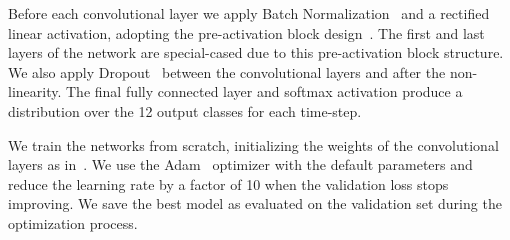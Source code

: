 Before each convolutional layer we apply Batch
Normalization~\cite{ioffe2015batch} and a rectified linear activation, adopting
the pre-activation block design~\cite{he2016deep}. The first and last layers of
the network are special-cased due to this pre-activation block structure. We
also apply Dropout~\cite{srivastava2014dropout} between the convolutional
layers and after the non-linearity. The final fully connected layer and softmax
activation produce a distribution over the 12 output classes for each
time-step.

We train the networks from scratch, initializing the weights of the
convolutional layers as in~\cite{he2015delving}. We use the
Adam~\cite{kingma2014adam} optimizer with the default parameters and reduce the
learning rate by a factor of 10 when the validation loss stops improving. We
save the best model as evaluated on the validation set during the optimization
process.
